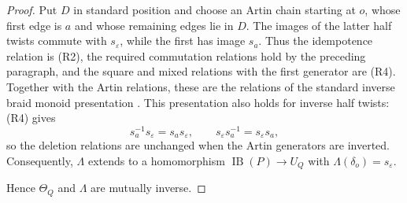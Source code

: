 \documentclass[a4paper, 12pt, reqno]{amsart}
\theoremstyle{definition}
\newcommand{\IB}{\operatorname{IB}}
\begin{document}
\begin{proof}
Put $D$ in standard position and choose an Artin chain starting at $o$, whose first edge is $a$ and whose remaining edges lie in $D$. The images of the latter half twists commute with $s_\varepsilon$, while the first has image $s_a$. Thus the idempotence relation is (R2), the required commutation relations hold by the preceding paragraph, and the square and mixed relations with the first generator are (R4). Together with the Artin relations, these are the relations of the standard inverse braid monoid presentation \cite[relations~(1.7)]{Vershinin2009}. This presentation also holds for inverse half twists: (R4) gives
\[
s_a^{-1}s_\varepsilon=s_as_\varepsilon, \qquad  s_\varepsilon s_a^{-1}=s_\varepsilon s_a,
\]
so the deletion relations are unchanged when the Artin generators are inverted. Consequently, $\Lambda$ extends to a homomorphism $\IB(P)\to U_Q$ with $\Lambda(\delta_o)=s_\varepsilon$.

Hence $\Theta_Q$ and $\Lambda$ are mutually inverse.
\end{proof}
\end{document}
